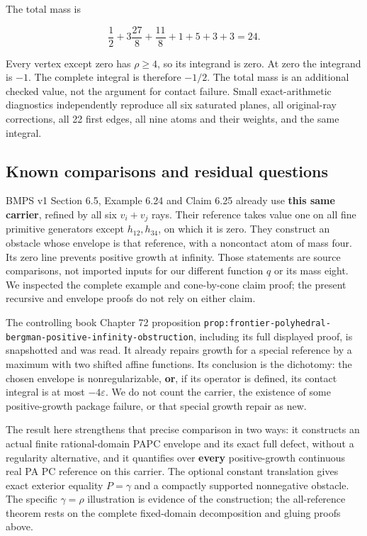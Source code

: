 \documentclass[
  10pt,
]{article}
\begin{document}
The total mass is

\[
\frac12+3\frac{27}{8}+\frac{11}{8}+1+5+3+3=24.
\]

Every vertex except zero has \(\rho\geq4\), so its integrand is zero. At
zero the integrand is \(-1\). The complete integral is therefore
\(-1/2\). The total mass is an additional checked value, not the
argument for contact failure. Small exact-arithmetic diagnostics
independently reproduce all six saturated planes, all original-ray
corrections, all 22 first edges, all nine atoms and their weights, and
the same integral.

\subsection{Known comparisons and residual
questions}\label{known-comparisons-and-residual-questions}

BMPS v1 Section 6.5, Example 6.24 and Claim 6.25 already use
\textbf{this same carrier}, refined by all six \(v_i+v_j\) rays. Their
reference takes value one on all fine primitive generators except
\(h_{12},h_{34}\), on which it is zero. They construct an obstacle whose
envelope is that reference, with a noncontact atom of mass four. Its
zero line prevents positive growth at infinity. Those statements are
source comparisons, not imported inputs for our different function \(q\)
or its mass eight. We inspected the complete example and cone-by-cone
claim proof; the present recursive and envelope proofs do not rely on
either claim.

The controlling book Chapter 72 proposition
\texttt{prop:frontier-}\allowbreak{}\texttt{polyhedral-}\allowbreak{}\texttt{bergman-}\allowbreak{}\texttt{positive-}\allowbreak{}\texttt{infinity-}\allowbreak{}\texttt{obstruction},
including its full displayed proof, is snapshotted and was read. It
already repairs growth for a special reference by a maximum with two
shifted affine functions. Its conclusion is the dichotomy: the chosen
envelope is nonregularizable, \textbf{or}, if its operator is defined,
its contact integral is at most \(-4\varepsilon\). We do not count the
carrier, the existence of some positive-growth package failure, or that
special growth repair as new.

The result here strengthens that precise comparison in two ways: it
constructs an actual finite rational-domain PAPC envelope and its exact
full defect, without a regularity alternative, and it quantifies over
\textbf{every} positive-growth continuous real PA PC reference on this
carrier. The optional constant translation gives exact exterior equality
\(P=\gamma\) and a compactly supported nonnegative obstacle. The
specific \(\gamma=\rho\) illustration is evidence of the construction;
the all-reference theorem rests on the complete fixed-domain
decomposition and gluing proofs above.
\end{document}
